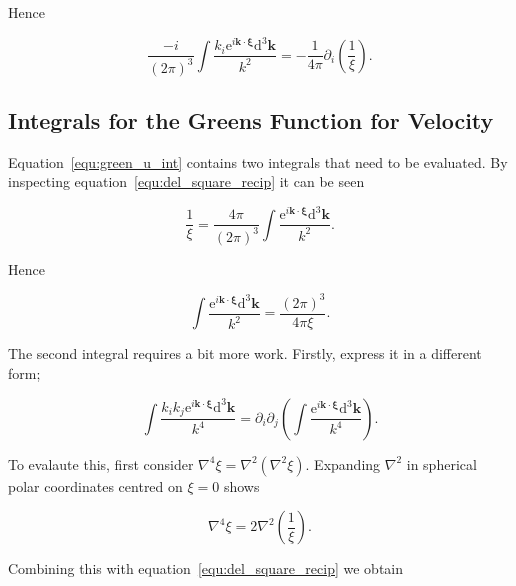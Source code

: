 \documentclass[12pt]{article}
\begin{document}
Hence

\begin{equation}
\label{equ:green_p_ident}
\frac{-i}{(2 \pi)^{3}} \int \frac{ k_{i} \mathrm{e}^{i \boldsymbol{k} \cdot \boldsymbol{\xi}} \mathrm{d}^{3} \boldsymbol{k}}{k^{2}} = -\frac{1}{4 \pi} \partial_{i} \left(\frac{1}{\xi}\right) .
\end{equation}

\subsection{Integrals for the Greens Function for Velocity}
\label{sub_app:green_vel}

Equation~\ref{equ:green_u_int} contains two integrals that need to be evaluated. By inspecting equation~\ref{equ:del_square_recip} it can be seen

\begin{equation}
\label{equ:recip_int}
\frac{1}{\xi} = \frac{4 \pi}{(2 \pi)^{3}} \int \frac{\mathrm{e}^{i \boldsymbol{k} \cdot \boldsymbol{\xi}} \mathrm{d}^{3} \boldsymbol{k}}{k^{2}} .
\end{equation}

Hence

\begin{equation}
\label{equ:green_u_int1}
\int \frac{\mathrm{e}^{i \boldsymbol{k} \cdot \boldsymbol{\xi}} \mathrm{d}^{3} \boldsymbol{k}}{k^{2}} = \frac{(2 \pi)^{3}}{4 \pi \xi} .
\end{equation}

The second integral requires a bit more work. Firstly, express it in a different form;

\begin{equation}
\label{equ:green_u_int2_new}
\int \frac{k_{i} k_{j} \mathrm{e}^{i \boldsymbol{k} \cdot \boldsymbol{\xi}} \mathrm{d}^{3} \boldsymbol{k}}{k^{4}} = \partial_{i} \partial_{j} \left(\int \frac{\mathrm{e}^{i \boldsymbol{k} \cdot \boldsymbol{\xi}} \mathrm{d}^{3} \boldsymbol{k}}{k^{4}} \right) .
\end{equation}

To evalaute this, first consider $\nabla^{4} \xi = \nabla^{2}(\nabla^{2} \xi)$. Expanding $\nabla^{2}$ in spherical polar coordinates centred on $\xi = 0$ shows

\begin{equation}
\label{equ:del4}
\nabla^{4} \xi = 2 \nabla^{2} \left(\frac{1}{\xi}\right) .
\end{equation}

Combining this with equation~\ref{equ:del_square_recip} we obtain
\end{document}
